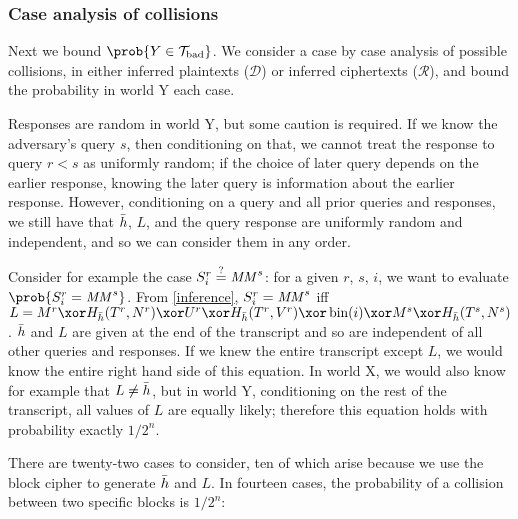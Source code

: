 \documentclass[hctr2.tex]{subfiles}
\begin{document}
\subsubsection{Case analysis of collisions}
Next we bound \(\prob{Y \in \Tb}\).
We consider a case by case analysis of possible collisions,
in either inferred plaintexts (\(\mathcal{D}\))
or inferred ciphertexts (\(\mathcal{R}\)),
and bound the probability in world Y each case.

Responses are random in world Y,
but some caution is required.
If we know the adversary's query \(s\), then conditioning on that,
we cannot treat the response to query \(r < s\) as uniformly random;
if the choice of later query depends on the earlier response,
knowing the later query is information about the earlier response.
However, conditioning on a query and all prior queries and responses,
we still have that \(\bar{h}\), \(L\), and the
query response are uniformly random and independent,
and so we can consider them in any order.

Consider for example the case \(S_i^r \stackrel{\text{?}}{=} \mathit{MM}^s\):
for a given \(r\), \(s\), \(i\),
we want to evaluate \(\prob{S_i^r = \MM^s}\).
From \ref{inference}, \(S_i^r = \mathit{MM}^s\)
iff \(L = M^r \xor H_{\hgen}(T^r, N^r) \xor U^r \xor H_{\hgen}(T^r, V^r)
\xor \fromint(i) \xor M^s \xor H_{\hgen}(T^s, N^s)\).
\(\bar{h}\) and \(L\) are given at the end of the transcript
and so are independent of all other queries and responses.
If we knew the entire transcript except \(L\),
we would know the entire right hand side of this equation.
In world X, we would also know for example that \(L \neq \bar{h}\), but
in world Y, conditioning on the rest of the transcript,
all values of \(L\) are equally likely;
therefore this equation holds with probability exactly \(1/2^n\).

There are twenty-two cases to consider,
ten of which arise because we use the block cipher
to generate \(\bar{h}\) and \(L\).
In fourteen cases, the probability of a collision
between two specific blocks is \(1/2^n\):
\end{document}
